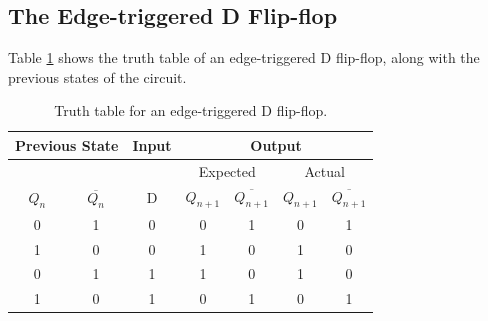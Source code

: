 \documentclass{report}
\begin{document}
	\subsection{The Edge-triggered D Flip-flop}
	Table \ref{section6} shows the truth table of an edge-triggered D flip-flop, along with the previous states of the circuit.
	\begin{table}[h]
		\centering
		\begin{tabular}{@{}cc|c|cccc@{}}
			\toprule
			\multicolumn{2}{c|}{Previous State}                 & Input                    & \multicolumn{4}{c}{Output}                                 \\ \midrule
			\cellcolor[HTML]{000000} & \cellcolor[HTML]{000000} & \cellcolor[HTML]{000000} & \multicolumn{2}{c|}{Expected} & \multicolumn{2}{c}{Actual} \\ \midrule
			$Q_{n}$                        & $\overline{Q_{n}}$                     & D                        & $Q_{n+1}$  & \multicolumn{1}{c|}{$\overline{Q_{n+1}}$} & $Q_{n+1}$           & $\overline{Q_{n+1}}$          \\ \midrule
			0                        & 1                        & 0                        & 0   & \multicolumn{1}{c|}{1}  & 0            & 1           \\
			1                        & 0                        & 0                        & 1   & \multicolumn{1}{c|}{0}  & 1            & 0           \\
			0                        & 1                        & 1                        & 1   & \multicolumn{1}{c|}{0}  & 1            & 0           \\
			1                        & 0                        & 1                        & 0   & \multicolumn{1}{c|}{1}  & 0            & 1           \\ \bottomrule
		\end{tabular}
		\caption{Truth table for an edge-triggered D flip-flop.}
		\label{section6}
	\end{table}
	
\end{document}
